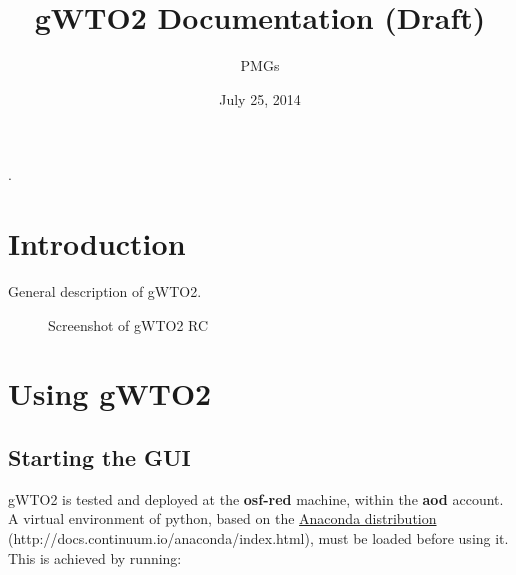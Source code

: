 \documentclass[a4paper,10pt,english]{sphinxmanual}
\title{gWTO2 Documentation (Draft)}
\date{July 25, 2014}
\author{PMGs}
\begin{document}
\maketitle
\tableofcontents
{}\label{index::doc}


.


\chapter{Introduction}
\label{intro2:introduction}\label{intro2:gwto2-documentation-contents}\label{intro2::doc}
General description of gWTO2.
\begin{figure}[htbp]
\centering
\capstart

\caption{Screenshot of gWTO2 RC}\end{figure}


\chapter{Using gWTO2}
\label{usingwto:using-gwto2}\label{usingwto::doc}

\section{Starting the GUI}
\label{usingwto:starting-the-gui}
gWTO2 is tested and deployed at the \textbf{osf-red} machine, within the \textbf{aod} account.
A virtual environment of python, based on the
\href{http://docs.continuum.io/anaconda/index.html}{Anaconda distribution} (http://docs.continuum.io/anaconda/index.html),
must be loaded before using it. This is achieved by running:
\end{document}
